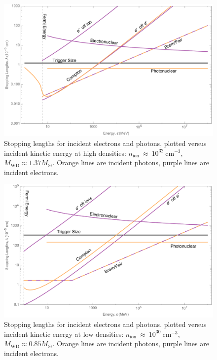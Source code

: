 \documentclass[twocolumn, preprintnumbers,amsmath,amssymb,prd, superscriptaddress]{revtex4}
\begin{document}
\begin{figure}
\includegraphics[scale=.3]{SPhighEM.pdf}
\caption{Stopping lengths for incident electrons and photons, plotted versus incident kinetic energy at high densities: $n_\text{ion}~\approx~10^{32}~\text{cm}^{-3}$, $M_\text{WD} \approx 1.37 M_{\astrosun}$. Orange lines are incident photons, purple lines are incident electrons.}
\label{fig:SPhighEM}
\end{figure}

\begin{figure}
\includegraphics[scale=.3]{SPlowEM.pdf}
\caption{Stopping lengths for incident electrons and photons. plotted versus incident kinetic energy at low densities: $n_\text{ion}~\approx~10^{30}~\text{cm}^{-3}$, $M_\text{WD} \approx 0.85 M_{\astrosun}$. Orange lines are incident photons, purple lines are incident electrons.}
\label{fig:SPlowEM}
\end{figure}
\end{document}
